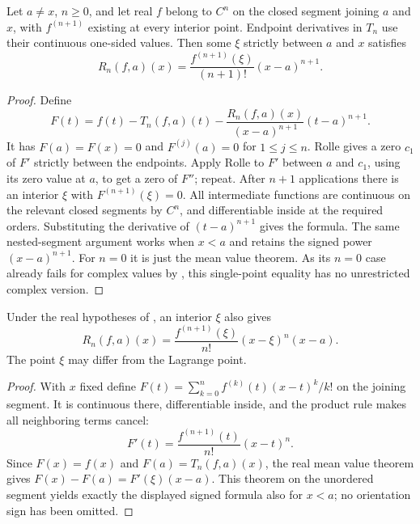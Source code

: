\begin{theorem}
Let $a\ne x$, $n\ge0$, and let real $f$ belong to $C^n$ on the closed segment joining $a$ and $x$, with $f^{(n+1)}$ existing at every interior point. Endpoint derivatives in $T_n$ use their continuous one-sided values. Then some $\xi$ strictly between $a$ and $x$ satisfies
\[ R_n(f,a)(x)=\frac{f^{(n+1)}(\xi)}{(n+1)!}(x-a)^{n+1}. \]
\end{theorem}
\begin{proof}
Define
\[ F(t)=f(t)-T_n(f,a)(t)-\frac{R_n(f,a)(x)}{(x-a)^{n+1}}(t-a)^{n+1}. \]
It has $F(a)=F(x)=0$ and $F^{(j)}(a)=0$ for $1\le j\le n$. Rolle gives a zero $c_1$ of $F'$ strictly between the endpoints. Apply Rolle to $F'$ between $a$ and $c_1$, using its zero value at $a$, to get a zero of $F''$; repeat. After $n+1$ applications there is an interior $\xi$ with $F^{(n+1)}(\xi)=0$. All intermediate functions are continuous on the relevant closed segments by $C^n$, and differentiable inside at the required orders. Substituting the derivative of $(t-a)^{n+1}$ gives the formula. The same nested-segment argument works when $x<a$ and retains the signed power $(x-a)^{n+1}$. For $n=0$ it is just the mean value theorem. As its $n=0$ case already fails for complex values by , this single-point equality has no unrestricted complex version.
\end{proof}

\begin{theorem}
Under the real hypotheses of , an interior $\xi$ also gives
\[ R_n(f,a)(x)=\frac{f^{(n+1)}(\xi)}{n!}(x-\xi)^n(x-a). \]
The point $\xi$ may differ from the Lagrange point.
\end{theorem}
\begin{proof}
With $x$ fixed define $F(t)=\sum_{k=0}^n f^{(k)}(t)(x-t)^k/k!$ on the joining segment. It is continuous there, differentiable inside, and the product rule makes all neighboring terms cancel:
\[ F'(t)=\frac{f^{(n+1)}(t)}{n!}(x-t)^n. \]
Since $F(x)=f(x)$ and $F(a)=T_n(f,a)(x)$, the real mean value theorem gives $F(x)-F(a)=F'(\xi)(x-a)$. This theorem on the unordered segment yields exactly the displayed signed formula also for $x<a$; no orientation sign has been omitted.
\end{proof}

